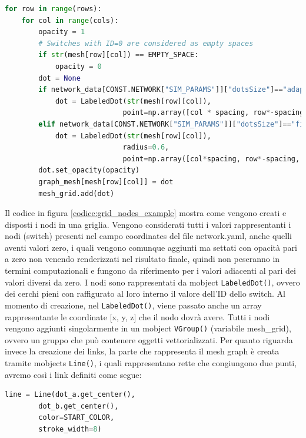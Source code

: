 \documentclass[binding=0.6cm]{sapthesis}
\begin{document}
{\scriptsize %
\begin{lstlisting}[language=Python, caption={Creazione posizionamento nodi griglia}, label={codice:grid_nodes_example}]
for row in range(rows):
    for col in range(cols):
        opacity = 1
        # Switches with ID=0 are considered as empty spaces
        if str(mesh[row][col]) == EMPTY_SPACE:
            opacity = 0
        dot = None
        if network_data[CONST.NETWORK["SIM_PARAMS"]]["dotsSize"]=="adaptive":
            dot = LabeledDot(str(mesh[row][col]), 
                            point=np.array([col * spacing, row*-spacing, 0]))
        elif network_data[CONST.NETWORK["SIM_PARAMS"]]["dotsSize"]=="fixed":
            dot = LabeledDot(str(mesh[row][col]), 
                            radius=0.6, 
                            point=np.array([col*spacing, row*-spacing, 0]))
        dot.set_opacity(opacity)
        graph_mesh[mesh[row][col]] = dot
        mesh_grid.add(dot)
\end{lstlisting}
}

Il codice in figura \ref{codice:grid_nodes_example} mostra come vengono creati e disposti i nodi in una griglia. 
Vengono considerati tutti i valori rappresentanti i nodi (switch)
presenti nel campo coordinates del file network.yaml, anche quelli aventi valori zero,
 i quali vengono comunque aggiunti ma settati con opacità pari a zero non venendo renderizzati nel risultato finale,
quindi non peseranno in termini computazionali e fungono da riferimento per i valori adiacenti al pari dei valori diversi da zero.
I nodi sono rappresentati da mobject \lstinline|LabeledDot()|, ovvero dei cerchi pieni con raffigurato al loro interno il valore dell'ID dello switch. Al momento di creazione, nel \lstinline|LabeledDot()|,
viene passato anche un array rappresentante le coordinate [x, y, z] che il nodo dovrà avere. 
Tutti i nodi vengono aggiunti singolarmente in un mobject \lstinline|VGroup()| (variabile mesh\_grid),
ovvero un gruppo che può contenere oggetti vettorializzati.
Per quanto riguarda invece la creazione dei links, la parte che rappresenta il mesh graph è creata tramite mobjects \lstinline|Line()|, i quali
rappresentano rette che congiungono due punti, avremo così i link definiti come segue:

{\scriptsize %
\begin{lstlisting}[language=Python, caption={Creazione link}, label={codice:link_creation_example}]
    line = Line(dot_a.get_center(), 
        dot_b.get_center(), 
        color=START_COLOR, 
        stroke_width=8)
\end{lstlisting}
}
\end{document}
